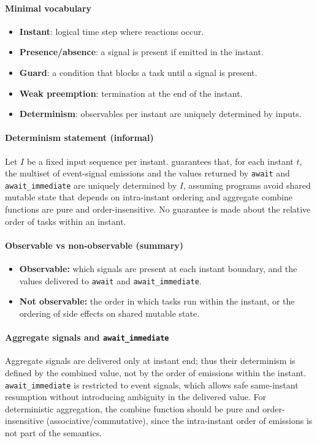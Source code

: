 \paragraph{Minimal vocabulary}
\begin{itemize}
\item \textbf{Instant}: logical time step where reactions occur.
\item \textbf{Presence/absence}: a signal is present if emitted in the instant.
\item \textbf{Guard}: a condition that blocks a task until a signal is present.
\item \textbf{Weak preemption}: termination at the end of the instant.
\item \textbf{Determinism}: observables per instant are uniquely determined by inputs.
\end{itemize}

\paragraph{Determinism statement (informal)}
Let $I$ be a fixed input sequence per instant. \tempo{} guarantees that, for each
instant $t$, the multiset of event-signal emissions and the values returned by
\texttt{await} and \texttt{await\_immediate} are uniquely determined by $I$,
assuming programs avoid shared mutable state that depends on intra-instant
ordering and aggregate combine functions are pure and order-insensitive. No
guarantee is made about the relative order of tasks within an instant.
\paragraph{Observable vs non-observable (summary)}
\begin{itemize}
\item \textbf{Observable:} which signals are present at each instant boundary,
  and the values delivered to \texttt{await} and \texttt{await\_immediate}.
\item \textbf{Not observable:} the order in which tasks run within the instant,
  or the ordering of side effects on shared mutable state.
\end{itemize}
\paragraph{Aggregate signals and \texttt{await\_immediate}}
Aggregate signals are delivered only at instant end; thus their determinism is
defined by the combined value, not by the order of emissions within the instant.
\texttt{await\_immediate} is restricted to event signals, which allows safe
same-instant resumption without introducing ambiguity in the delivered value.
For deterministic aggregation, the combine function should be pure and
order-insensitive (associative/commutative), since the intra-instant order of
emissions is not part of the semantics.

